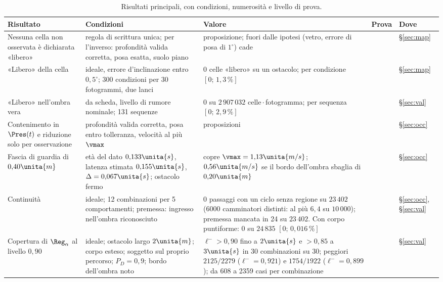 \begin{table}[p]
\centering\footnotesize
\setlength{\tabcolsep}{4pt}
\caption{Risultati principali, con condizioni, numerosità e livello di prova.}\label{tab:intro-sintesi}
\begin{tabularx}{\textwidth}{@{}>{\RaggedRight\arraybackslash}p{2.8cm}>{\RaggedRight\arraybackslash}p{4.1cm}L>{\RaggedRight\arraybackslash}p{1.2cm}>{\RaggedRight\arraybackslash}p{1.05cm}@{}}
\toprule
Risultato & Condizioni & Valore & Prova & Dove\\
\midrule
Nessuna cella non osservata è dichiarata «libero» & regola di scrittura unica; per l'inverso: profondità valida corretta, posa esatta, suolo piano & proposizione; fuori dalle ipotesi (vetro, errore di posa di $1^\circ$) cade &  & \S\ref{sec:map}\\
«Libero» della cella & ideale, errore d'inclinazione entro $0{,}5^\circ$; 300 condizioni per 30 fotogrammi, due lanci & 0 celle «libero» su un ostacolo; per condizione $[0;\,1{,}3\,\%]$ &  & \S\ref{sec:map}\\
«Libero» nell'ombra vera & da scheda, livello di rumore nominale; 131 sequenze & 0 su $2\,907\,032$ celle\,$\cdot$\,fotogramma; per sequenza $[0;\,2{,}9\,\%]$ &  & \S\ref{sec:val}\\
Contenimento in $\Pres(t)$ e riduzione solo per osservazione & profondità valida corretta, posa entro tolleranza, velocità al più $\vmax$ & proposizioni &  & \S\ref{sec:occ}\\
Fascia di guardia di $0{,}40\unita{m}$ & età del dato $0{,}133\unita{s}$, latenza stimata $0{,}155\unita{s}$, $\Delta=0{,}067\unita{s}$; ostacolo fermo & copre $\vmax=1{,}13\unita{m/s}$; $0{,}56\unita{m/s}$ se il bordo dell'ombra sbaglia di $0{,}20\unita{m}$ &  & \S\ref{sec:occ}\\
Continuità & ideale; 12 combinazioni per 5 comportamenti; premessa: ingresso nell'ombra riconosciuto & 0 passaggi con un ciclo senza regione su $23\,402$ (6000 camminatori distinti: al più $6{,}4$ su $10\,000$); premessa mancata in 24 su $23\,402$. Con corpo puntiforme: 0 su $24\,835$ $[0;\,0{,}016\,\%]$ &  & \S\ref{sec:occ}, \S\ref{sec:val}\\
Copertura di $\Reg_\alpha$ al livello $0{,}90$ & ideale; ostacolo largo $2\unita{m}$; corpo esteso; soggetto sul proprio percorso; $P_D=0{,}9$; bordo dell'ombra noto & $\ell^->0{,}90$ fino a $2\unita{s}$ e $>0{,}85$ a $3\unita{s}$ in 30 combinazioni su 30; peggiori $2125/2279$ ($\ell^-=0{,}921$) e $1754/1922$ ($\ell^-=0{,}899$); da 608 a 2359 casi per combinazione &  & \S\ref{sec:val}\\

\end{tabularx}
\end{table}
